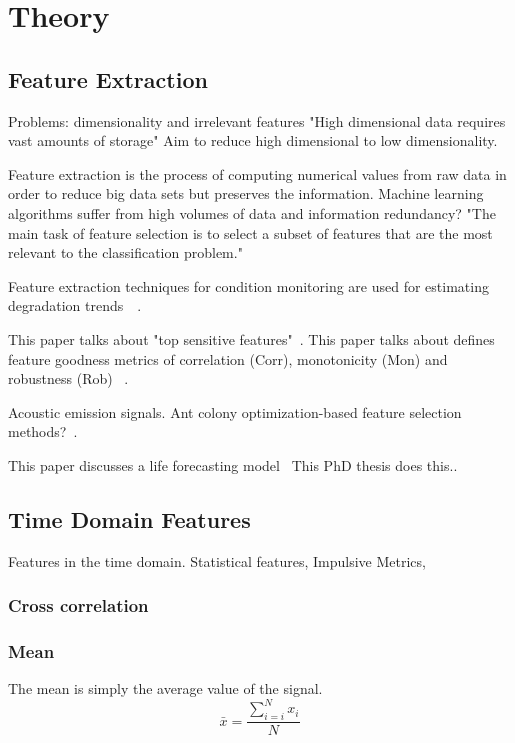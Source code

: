 \documentclass{article}
\begin{document}
\section{Theory}
\subsection{Feature Extraction}

Problems: dimensionality and irrelevant features
"High dimensional data requires vast amounts of storage"
Aim to reduce high dimensional to low dimensionality.

Feature extraction is the process of computing numerical values from raw data in order to reduce big data sets but preserves the information. Machine learning algorithms suffer from high volumes of data and information redundancy?
"The main task of feature selection is to select
a subset of features that are the most relevant to the classification problem." ~\cite{ahmed2020condition}

Feature extraction techniques for condition monitoring are used for estimating degradation trends~\cite{caesarendra2017review}~\cite{adams2017comparison}.

This paper talks about "top sensitive features"~\cite{bleakie2013feature}.
This paper talks about defines feature goodness metrics of correlation (Corr), monotonicity (Mon) and robustness (Rob) ~\cite{zhang2016degradation}.

Acoustic emission signals. Ant colony optimization-based feature selection methods?~\cite{liao2010feature}.

This paper discusses a life forecasting model~\cite{wang2016multiple}
This PhD thesis does this..~\cite{martin2017unsupervised}

\subsection{Time Domain Features} 	
Features in the time domain. Statistical features, Impulsive Metrics, 
\subsubsection{Cross correlation}
\subsubsection{Mean}
The mean is simply the average value of the signal.
$$ \bar{x} = \frac{\sum^N_{i=i} x_i}{N} $$
\end{document}
